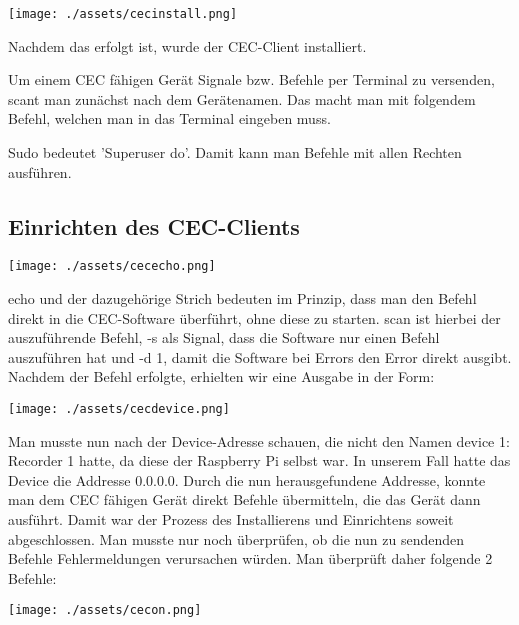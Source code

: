 \documentclass[a4paper]{article}
\begin{document}
\begin{center}
\texttt{[image: ./assets/cecinstall.png]}
\end{center}

\noindent

Nachdem das erfolgt ist, wurde der CEC-Client installiert. \\

\noindent

Um einem CEC fähigen Gerät Signale bzw. Befehle per Terminal zu versenden, scant man zunächst nach dem Gerätenamen. Das macht man mit folgendem Befehl, welchen man in das Terminal eingeben muss.

Sudo bedeutet 'Superuser do'. Damit kann man Befehle mit allen Rechten ausführen.

\subsection{Einrichten des CEC-Clients}

\begin{center}
\texttt{[image: ./assets/cececho.png]}
\end{center}

echo und der dazugehörige Strich bedeuten im Prinzip, dass man den Befehl direkt 
in die CEC-Software überführt, ohne diese zu starten. scan ist hierbei der auszuführende Befehl, -s als Signal, dass die Software nur einen Befehl auszuführen hat und -d 1, damit die Software bei Errors den Error direkt ausgibt. Nachdem der Befehl erfolgte, erhielten wir eine Ausgabe in der Form:

\begin{center}
\texttt{[image: ./assets/cecdevice.png]}
\end{center}

Man musste nun nach der Device-Adresse schauen, die nicht den Namen device 1: Recorder 1 hatte, da diese der Raspberry Pi selbst war. In unserem Fall hatte das Device die Addresse 0.0.0.0. Durch die nun herausgefundene Addresse, konnte man dem CEC fähigen Gerät direkt Befehle übermitteln, die das Gerät dann ausführt. 
Damit war der Prozess des Installierens und Einrichtens soweit abgeschlossen. Man musste nur noch überprüfen, ob die nun zu sendenden Befehle Fehlermeldungen verursachen würden. Man überprüft daher folgende 2 Befehle: 

\begin{center}
\texttt{[image: ./assets/cecon.png]}
\end{center}
\end{document}
